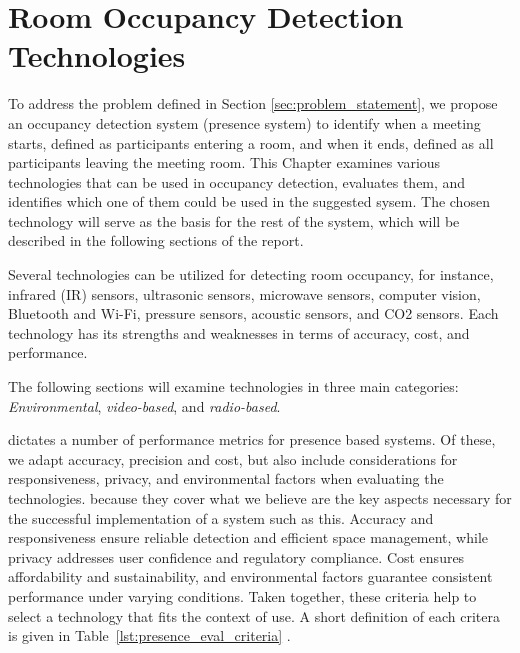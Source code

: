 \chapter{\label{sec:presence_intro}Room Occupancy Detection Technologies}
To address the problem defined in Section \ref{sec:problem_statement}, we propose an occupancy detection system (presence system) to identify when a meeting starts, defined as participants entering a room, and when it ends, defined as all participants leaving the meeting room.
This Chapter examines various technologies that can be used in occupancy detection, evaluates them, and identifies which one of them could be used in the suggested sysem.
The chosen technology will serve as the basis for the rest of the system, which will be described in the following sections of the report.

Several technologies can be utilized for detecting room occupancy, for instance, infrared (IR) sensors\cite{woodward-2021, dodierBuildingOccupancyDetection2006, OccupancySensorMotion}, ultrasonic sensors\cite{woodward-2021, dodierBuildingOccupancyDetection2006, OccupancySensorMotion}, microwave sensors\cite{woodward-2021}, computer vision\cite{co2sensor, longoAccurateOccupancyEstimation2019, OccupancySensorMotion}, Bluetooth and Wi-Fi\cite{teissedre-2019}, pressure sensors\cite{OccupancySensorMotion}, acoustic sensors\cite{OccupancySensorMotion}, and CO2 sensors\cite{co2sensor, longoAccurateOccupancyEstimation2019, jinSensingProxyOccupancy2015}.\cite{faragherLocationFingerprintingBluetooth2015}
Each technology has its strengths and weaknesses in terms of accuracy, cost, and performance.

The following sections will examine technologies in three main categories: \textit{Environmental}, \textit{video-based}, and \textit{radio-based}.

\citeauthor{presence_ble_review} \cite{presence_ble_review} dictates a number of performance metrics for presence based systems. Of these, we adapt accuracy, precision and cost, but also include considerations for responsiveness, privacy, and environmental factors when evaluating the technologies.
because they cover what we believe are the key aspects necessary for the successful implementation of a system such as this.
Accuracy and responsiveness ensure reliable detection and efficient space management, while privacy addresses user confidence and regulatory compliance.
Cost ensures affordability and sustainability, and environmental factors guarantee consistent performance under varying conditions.
Taken together, these criteria help to select a technology that fits the context of use.
A short definition of each critera is given in Table~\ref{lst:presence_eval_criteria} .

